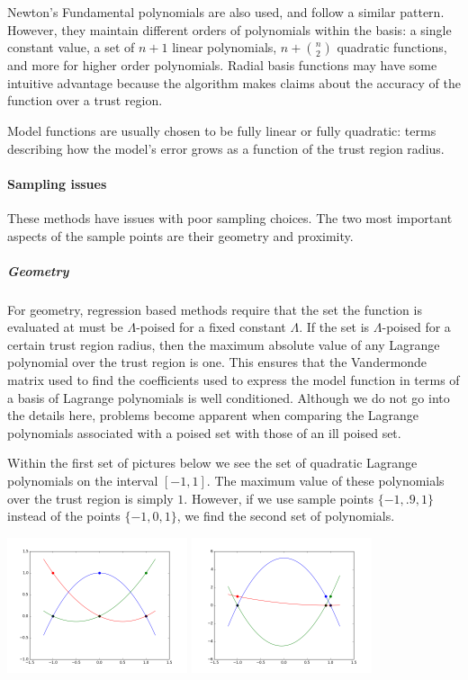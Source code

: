 \documentclass{article}
\begin{document}
Newton's Fundamental polynomials are also used, and follow a similar pattern.
However, they maintain different orders of polynomials within the basis:
a single constant value, a set of $n+1$ linear polynomials,
$n + {n \choose 2}$ quadratic functions, and more for higher order polynomials.
Radial basis functions may have some intuitive advantage because the algorithm makes claims about the accuracy of the function over a trust region.


Model functions are usually chosen to be fully linear or fully quadratic: terms describing how the model's error grows as a function of the trust region radius.

\paragraph{Sampling issues}

These methods have issues with poor sampling choices.
The two most important aspects of the sample points are their geometry and proximity.

\subparagraph{Geometry}

For geometry, regression based methods require that the set the function is evaluated at must be $\Lambda$-poised for a fixed constant $\Lambda$.
If the set is $\Lambda$-poised for a certain trust region radius, then the maximum absolute value of any Lagrange polynomial over the trust region is one.
This ensures that the Vandermonde matrix used to find the coefficients used to express the model function in terms of a basis of Lagrange polynomials is well conditioned.
Although we do not go into the details here, problems become apparent when comparing the Lagrange polynomials associated with a poised set with those of an ill poised set.

Within the first set of pictures below we see the set of quadratic Lagrange polynomials on the interval $[-1,1]$.
The maximum value of these polynomials over the trust region is simply $1$.
However, if we use sample points $\{-1, .9, 1\}$ instead of the points $\{-1, 0, 1\}$,
we find the second set of polynomials.

\includegraphics[width=200px]{poised.png}
\includegraphics[width=200px]{illpoised.png}
\end{document}
